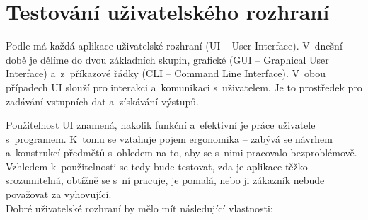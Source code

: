 		\section{Testování uživatelského rozhraní}
		Podle \citep{Patton} má každá aplikace uživatelské rozhraní (UI -- User Interface). V~dnešní době je dělíme do dvou základních skupin, grafické (GUI -- Graphical User Interface) a~z~příkazové řádky (CLI -- Command Line Interface). V~obou případech UI slouží pro interakci a~komunikaci s~uživatelem. Je to prostředek pro zadávání vstupních dat a~získávání výstupů.
		
		Použitelnost UI znamená, nakolik funkční a~efektivní je práce uživatele s~programem. K~tomu se vztahuje pojem ergonomika -- zabývá se návrhem a~konstrukcí předmětů s~ohledem na to, aby se s~nimi pracovalo bezproblémově. Vzhledem k~použitelnosti se tedy bude testovat, zda je aplikace těžko srozumitelná, obtížně se s~ní pracuje, je pomalá, nebo ji zákazník nebude považovat za vyhovující.
		\\[\topsep]Dobré uživatelské rozhraní by mělo mít následující vlastnosti:
		\vspace{-\topsep}
